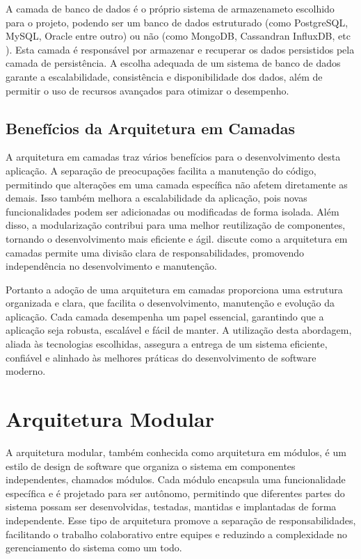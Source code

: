 A camada de banco de dados é o próprio sistema de armazenameto escolhido para o projeto, podendo ser um banco de dados estruturado (como PostgreSQL, MySQL, Oracle entre outro) ou não (como MongoDB, Cassandran InfluxDB, etc ). Esta camada é responsável por armazenar e recuperar os dados persistidos pela camada de persistência. A escolha adequada de um sistema de banco de dados garante a escalabilidade, consistência e disponibilidade dos dados, além de permitir o uso de recursos avançados para otimizar o desempenho.

\subsection{Benefícios da Arquitetura em Camadas}

A arquitetura em camadas traz vários benefícios para o desenvolvimento desta aplicação. A separação de preocupações facilita a manutenção do código, permitindo que alterações em uma camada específica não afetem diretamente as demais. Isso também melhora a escalabilidade da aplicação, pois novas funcionalidades podem ser adicionadas ou modificadas de forma isolada. Além disso, a modularização contribui para uma melhor reutilização de componentes, tornando o desenvolvimento mais eficiente e ágil. \cite{Martin17} discute como a arquitetura em camadas permite uma divisão clara de responsabilidades, promovendo independência no desenvolvimento e manutenção.

Portanto a adoção de uma arquitetura em camadas proporciona uma estrutura organizada e clara, que facilita o desenvolvimento, manutenção e evolução da aplicação. Cada camada desempenha um papel essencial, garantindo que a aplicação seja robusta, escalável e fácil de manter. A utilização desta abordagem, aliada às tecnologias escolhidas, assegura a entrega de um sistema eficiente, confiável e alinhado às melhores práticas do desenvolvimento de software moderno.

\section{Arquitetura Modular}

A arquitetura modular, também conhecida como arquitetura em módulos, é um estilo de design de software que organiza o sistema em componentes independentes, chamados módulos. Cada módulo encapsula uma funcionalidade específica e é projetado para ser autônomo, permitindo que diferentes partes do sistema possam ser desenvolvidas, testadas, mantidas e implantadas de forma independente. Esse tipo de arquitetura promove a separação de responsabilidades, facilitando o trabalho colaborativo entre equipes e reduzindo a complexidade no gerenciamento do sistema como um todo.

